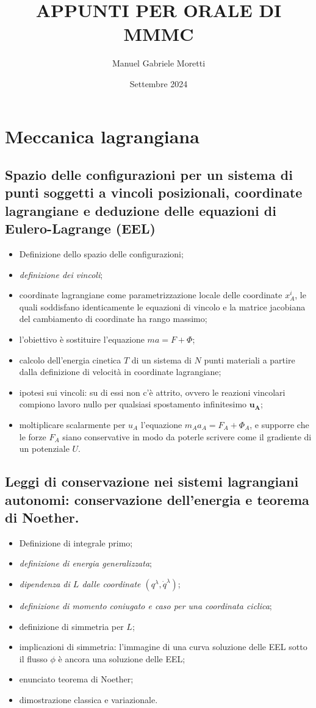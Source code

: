 \documentclass{article}
\title{\textbf{APPUNTI PER ORALE DI MMMC}}
\author{Manuel Gabriele Moretti}
\date{Settembre 2024}
\theoremstyle{remark}
\begin{document}
\maketitle

\section{Meccanica lagrangiana}
\subsection{Spazio delle configurazioni per un sistema di punti soggetti a vincoli posizionali, coordinate lagrangiane e deduzione delle equazioni di Eulero-Lagrange (EEL)}
\begin{itemize}
    \item Definizione dello spazio delle configurazioni;
    \item \textit{definizione dei vincoli};
    \item coordinate lagrangiane come parametrizzazione locale delle coordinate $x_A^i$, le quali soddisfano identicamente le equazioni di vincolo e la matrice jacobiana del cambiamento di coordinate ha rango massimo;
    \item l'obiettivo è sostituire l'equazione $ma=F+\Phi$;
    \item calcolo dell'energia cinetica $T$ di un sistema di $N$ punti materiali a partire dalla definizione di velocità in coordinate lagrangiane;
    \item ipotesi sui vincoli: su di essi non c'è attrito, ovvero le reazioni vincolari compiono lavoro nullo per qualsiasi spostamento infinitesimo $\bm{u_A}$;
    \item moltiplicare scalarmente per $u_A$ l'equazione $m_Aa_A=F_A+\Phi_A$, e supporre che le forze $F_A$ siano conservative in modo da poterle scrivere come il gradiente di un potenziale $U$.
\end{itemize}
\subsection{Leggi di conservazione nei sistemi lagrangiani autonomi: conservazione dell'energia e teorema di Noether.}
\begin{itemize}
    \item Definizione di integrale primo;
    \item \textit{definizione di energia generalizzata};
    \item \textit{dipendenza di $L$ dalle coordinate $(q^\lambda,\Dot{q}^\lambda)$};
    \item \textit{definizione di momento coniugato e caso per una coordinata ciclica};
    \item definizione di simmetria per $L$;
    \item implicazioni di simmetria: l'immagine di una curva soluzione delle EEL sotto il flusso $\phi$ è ancora una soluzione delle EEL;
    \item enunciato teorema di Noether;
    \item dimostrazione classica e variazionale.
\end{itemize}
\end{document}
